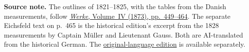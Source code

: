 \par{}\medskip\begin{small}\noindent\textbf{Source note.} The outlines of 1821--1825, with the tables from the Danish measurements, follow \href{https://gdz.sub.uni-goettingen.de/id/PPN236005081}{\textit{Werke}, Volume~IV (1873), pp.~449--464}. The separate Eichsfeld text on p.~465 is the historical edition’s excerpt from the 1828 measurements by Captain Müller and Lieutenant Gauss. Both are AI-translated from the historical German. The \href{https://github.com/KokunoYumeto/gauss-collected-works/releases/tag/gauss-original-language-2026-10-24}{original-language edition} is available separately.\par\end{small}
